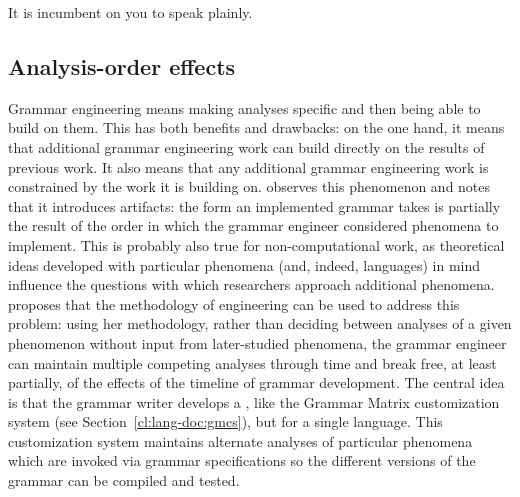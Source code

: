 \documentclass[output=paper
	        ,collection
	        ,collectionchapter
 	        ,biblatex
                ,babelshorthands
                ,newtxmath
                ,draftmode
                ,colorlinks, citecolor=brown
]{langscibook}
\begin{document}
\begin{exe}
\ex\label{cl:incumbent} 
It is incumbent on you to speak plainly.
\end{exe}%
%



\subsection{Analysis-order effects}

Grammar engineering means making analyses
specific and then being able to build on them. This has both benefits
and drawbacks: on the one hand, it means that additional grammar
engineering work can build directly on the results of previous
work. It also means that any additional grammar engineering work is
constrained by the work it is building on.  \cite{Fokkens:14} observes
this phenomenon and notes that it introduces artifacts: the form an
implemented grammar takes is partially the result of the order in
which the grammar engineer considered phenomena to implement. This is
probably also true for non-computational work, as theoretical ideas
developed with particular phenomena (and, indeed, languages) in mind
influence the questions with which researchers approach additional
phenomena. \citeauthor{Fokkens:14} proposes that the methodology of
\textit{} engineering can be used to address this problem: using
her  methodology, rather than deciding between analyses of a
given phenomenon without input from later-studied phenomena, the
grammar engineer can maintain multiple competing analyses through time
and break free, at least partially, of the effects of the timeline of
grammar development. The central idea is that the grammar writer develops
a , like the Grammar Matrix customization system (see Section~\ref{cl:lang-doc:gmcs}),
but for a single language. This customization system maintains
alternate analyses of particular phenomena which are invoked via grammar
specifications so the different versions of the grammar can be compiled
and tested.
\end{document}
